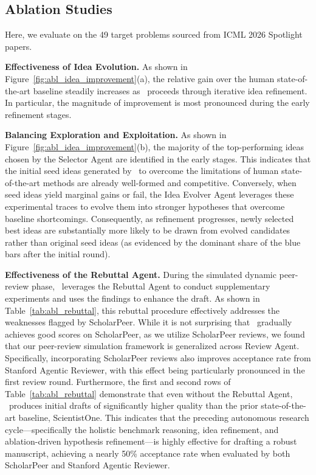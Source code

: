 \subsection{Ablation Studies}\label{subsec:ablation}

Here, we evaluate on the 49 target problems sourced from ICML 2026 Spotlight papers.


\noindent\textbf{Effectiveness of Idea Evolution.} As shown in Figure~\ref{fig:abl_idea_improvement}(a), the relative gain over the human state-of-the-art baseline steadily increases as \sname~proceeds through iterative idea refinement. In particular, the magnitude of improvement is most pronounced during the early refinement stages.

\noindent\textbf{Balancing Exploration and Exploitation.} As shown in Figure~\ref{fig:abl_idea_improvement}(b), the majority of the top-performing ideas chosen by the Selector Agent are identified in the early stages. This indicates that the initial seed ideas generated by \sname~to overcome the limitations of human state-of-the-art methods are already well-formed and competitive. Conversely, when seed ideas yield marginal gains or fail, the Idea Evolver Agent leverages these experimental traces to evolve them into stronger hypotheses that overcome baseline shortcomings. Consequently, as refinement progresses, newly selected best ideas are substantially more likely to be drawn from evolved candidates rather than original seed ideas (as evidenced by the dominant share of the blue bars after the initial round).


\noindent\textbf{Effectiveness of the Rebuttal Agent.} During the simulated dynamic peer-review phase, \sname~leverages the Rebuttal Agent to conduct supplementary experiments and uses the findings to enhance the draft. As shown in Table~\ref{tab:abl_rebuttal}, this rebuttal procedure effectively addresses the weaknesses flagged by ScholarPeer.
While it is not surprising that \sname~gradually achieves good scores on ScholarPeer, as we utilize ScholarPeer reviews, we found that our peer-review simulation framework is generalized across Review Agent. Specifically, incorporating ScholarPeer reviews also improves acceptance rate from Stanford Agentic Reviewer, with this effect being particularly pronounced in the first review round.
Furthermore, the first and second rows of Table~\ref{tab:abl_rebuttal} demonstrate that even without the Rebuttal Agent, \sname~produces initial drafts of significantly higher quality than the prior state-of-the-art baseline, ScientistOne. This indicates that the preceding autonomous research cycle—specifically the holistic benchmark reasoning, idea refinement, and ablation-driven hypothesis refinement—is highly effective for drafting a robust manuscript, achieving a nearly 50\% acceptance rate when evaluated by both ScholarPeer and Stanford Agentic Reviewer.

